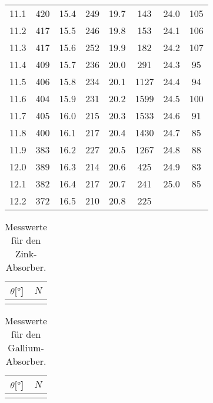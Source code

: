 \begin{table}[H]
\begin{tabular}{S[table-format=2.1] c | S[table-format=2.1] c | S[table-format=2.1] c | S[table-format=2.1] c}
\num{11.1} & \num{420}  &   \num{15.4} & \num{249}  &   \num{19.7} & \num{143}  &   \num{24.0} & \num{105}  \\
\num{11.2} & \num{417}  &   \num{15.5} & \num{246}  &   \num{19.8} & \num{153}  &   \num{24.1} & \num{106}  \\
\num{11.3} & \num{417}  &   \num{15.6} & \num{252}  &   \num{19.9} & \num{182}  &   \num{24.2} & \num{107}  \\
\num{11.4} & \num{409}  &   \num{15.7} & \num{236}  &   \num{20.0} & \num{291}  &   \num{24.3} & \num{95}   \\
\num{11.5} & \num{406}  &   \num{15.8} & \num{234}  &   \num{20.1} & \num{1127} &   \num{24.4} & \num{94}   \\
\num{11.6} & \num{404}  &   \num{15.9} & \num{231}  &   \num{20.2} & \num{1599} &   \num{24.5} & \num{100}  \\
\num{11.7} & \num{405}  &   \num{16.0} & \num{215}  &   \num{20.3} & \num{1533} &   \num{24.6} & \num{91}   \\
\num{11.8} & \num{400}  &   \num{16.1} & \num{217}  &   \num{20.4} & \num{1430} &   \num{24.7} & \num{85}   \\
\num{11.9} & \num{383}  &   \num{16.2} & \num{227}  &   \num{20.5} & \num{1267} &   \num{24.8} & \num{88}   \\
\num{12.0} & \num{389}  &   \num{16.3} & \num{214}  &   \num{20.6} & \num{425}  &   \num{24.9} & \num{83}   \\
\num{12.1} & \num{382}  &   \num{16.4} & \num{217}  &   \num{20.7} & \num{241}  &   \num{25.0} & \num{85}   \\
\num{12.2} & \num{372}  &   \num{16.5} & \num{210}  &   \num{20.8} & \num{225}  &              &            \\
  \bottomrule
  \end{tabular}
\end{table}


\begin{table}[H]
  \centering
  \caption{Messwerte für den Zink-Absorber.}
  \begin{tabular}{S[table-format=2.1] c}
  \toprule
  {$\theta [\si{\degree}$]} &
  {$N$} \\
  \midrule
  \bottomrule
  \end{tabular}
\end{table}

\begin{table}[H]
  \centering
  \caption{Messwerte für den Gallium-Absorber.}
  \begin{tabular}{S[table-format=2.1] c}
  \toprule
  {$\theta [\si{\degree}$]} &
  {$N$} \\
  \midrule
  \bottomrule
  \end{tabular}
\end{table}

